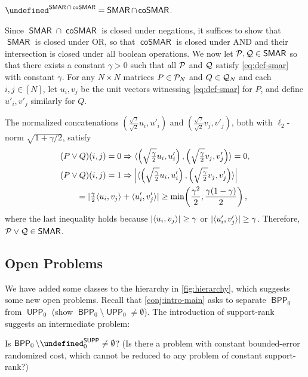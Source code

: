 \documentclass[conference]{IEEEtran}
\newcommand{\cplxclass}[1]{\mathsf{#1}}
\let\P\undefined\DeclareMathOperator{\P}{\cplxclass{P}}
\DeclareMathOperator{\BPP}{\cplxclass{BPP}}
\DeclareMathOperator{\UPP}{\cplxclass{UPP}}
\DeclareMathOperator{\SUPP}{\cplxclass{SUPP}}
\DeclareMathOperator{\SMAR}{\cplxclass{SMAR}}
\DeclareMathOperator{\coSMAR}{\cplxclass{coSMAR}}
\begin{document}
\begin{proposition}
    $\P^{\SMAR \cap \coSMAR} = \SMAR \cap \coSMAR$.
\end{proposition}
\begin{IEEEproof}
Since $\SMAR \cap \coSMAR$ is closed under negations, it suffices to show that
$\SMAR$ is closed under OR, so that $\coSMAR$ is closed under AND and their
intersection is closed under all boolean operations. We now let $\cP, \cQ \in \SMAR$ so
that there exists a constant $\gamma > 0$ such that all $\mathcal{P}$ and $\mathcal{Q}$ satisfy
\cref{eq:def-smar} with constant $\gamma$. For any $N \times N$ matrices $P \in
\mathcal{P}_N$ and $Q \in \mathcal{Q}_N$ and each $i,j \in [N]$, let $u_i, v_j$ be the unit vectors
witnessing \cref{eq:def-smar} for $P$, and define $u'_i, v'_j$ similarly for $Q$.

The normalized concatenations $\left(\tfrac{\sqrt \gamma}{\sqrt 2} u_i, u'_i\right)$ and
$\left(\tfrac{\sqrt{\gamma}}{\sqrt 2}v_j, v'_j\right)$, both with $\ell_2$-norm $\sqrt{1 + \gamma/2}$, satisfy
\begin{align*}
    (P \vee Q)(i,j) = 0 &\Rightarrow \langle \left(\sqrt{\tfrac{\gamma}{2}} u_i, u'_i\right), \left( \sqrt{\tfrac{\gamma}{2}} v_j, v'_j\right)  \rangle = 0, \\
    (P \vee Q)(i,j) = 1 &\Rightarrow
    \left|\langle \left(\sqrt{\tfrac{\gamma}{2}} u_i, u'_i\right), \left( \sqrt{\tfrac{\gamma}{2}} v_j, v'_j\right)  \rangle\right|\\
    =| \tfrac{\gamma}{2} \langle u_i, v_j \rangle &+ \langle u'_i, v'_j \rangle | \geq \min\!\left( \frac{\gamma^2}{2}, \frac{\gamma(1-\gamma)}{2}\right),
\end{align*}
where the last inequality holds because $|\langle u_i, v_j \rangle| \geq \gamma$ or
$|\langle u'_i, v'_j \rangle| \geq \gamma$. Therefore, $\cP \vee \cQ \in \SMAR$.
\end{IEEEproof}

\subsection{Open Problems}\label{sec:open-problems}

We have added some classes to the hierarchy in \cref{fig:hierarchy}, which
suggests some new open problems. Recall that \cref{conj:intro-main} asks to
separate $\BPP_0$ from $\UPP_0$ (\ie show $\BPP_0 \setminus \UPP_0 \neq
\emptyset$). The introduction of support-rank suggests an intermediate problem:

\begin{question}
    Is $\BPP_0 \setminus \P_0^{\SUPP} \neq \emptyset$? (Is there a problem with
    constant bounded-error randomized cost, which cannot be reduced to any
    problem of constant support-rank?)
\end{question}
\end{document}
